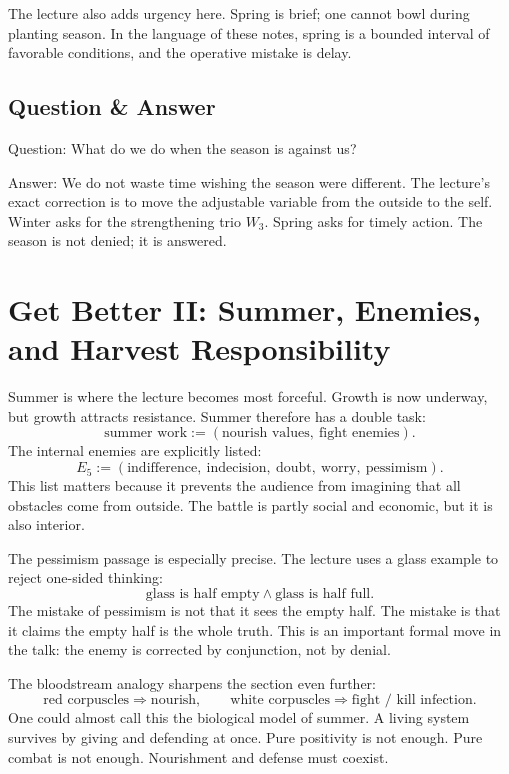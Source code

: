 The lecture also adds urgency here. Spring is brief; one cannot bowl during planting season. In the language of these notes, spring is a bounded interval of favorable conditions, and the operative mistake is delay.

\subsection{Question \& Answer}

Question: What do we do when the season is against us?

Answer: We do not waste time wishing the season were different. The lecture's exact correction is to move the adjustable variable from the outside to the self. Winter asks for the strengthening trio \(W_3\). Spring asks for timely action. The season is not denied; it is answered.

\section{Get Better II: Summer, Enemies, and Harvest Responsibility}

Summer is where the lecture becomes most forceful. Growth is now underway, but growth attracts resistance. Summer therefore has a double task:
\begin{equation}
\text{summer work} := (\text{nourish values},\ \text{fight enemies}).
\end{equation}
The internal enemies are explicitly listed:
\begin{equation}
E_5 := (\text{indifference},\ \text{indecision},\ \text{doubt},\ \text{worry},\ \text{pessimism}).
\end{equation}
This list matters because it prevents the audience from imagining that all obstacles come from outside. The battle is partly social and economic, but it is also interior.

The pessimism passage is especially precise. The lecture uses a glass example to reject one-sided thinking:
\begin{equation}
\text{glass is half empty} \land \text{glass is half full}.
\end{equation}
The mistake of pessimism is not that it sees the empty half. The mistake is that it claims the empty half is the whole truth. This is an important formal move in the talk: the enemy is corrected by conjunction, not by denial.

The bloodstream analogy sharpens the section even further:
\begin{equation}
\text{red corpuscles} \Rightarrow \text{nourish}, \qquad
\text{white corpuscles} \Rightarrow \text{fight / kill infection}.
\end{equation}
One could almost call this the biological model of summer. A living system survives by giving and defending at once. Pure positivity is not enough. Pure combat is not enough. Nourishment and defense must coexist.


